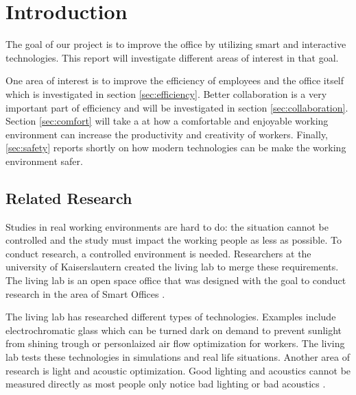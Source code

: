 \section{Introduction}
The goal of our project is to improve the office by utilizing smart and interactive technologies. This report will investigate different areas of interest in that goal. 


One area of interest is to improve the efficiency of employees and the office itself which is investigated in section \ref{sec:efficiency}. Better collaboration is a very important part of efficiency and will be investigated in section \ref{sec:collaboration}. Section \ref{sec:comfort} will take a at how a comfortable and enjoyable working environment can increase the productivity and creativity of workers. Finally, \ref{sec:safety} reports shortly on how modern technologies can be make the working environment safer.

\subsection{Related Research}
Studies in real working environments are hard to do: the situation cannot be controlled and the study must impact the working people as less as possible. To conduct research, a controlled environment is needed. Researchers at the university of Kaiserslautern created the living lab to merge these requirements. The living lab is an open space office that was designed with the goal to conduct research in the area of Smart Offices \cite{living-lab}.


The living lab has researched different types of technologies. Examples include electrochromatic glass which can be turned dark on demand to prevent sunlight from shining trough or personlaized air flow optimization for workers. The living lab tests these technologies in simulations and real life situations. Another area of research is light and acoustic optimization. Good lighting and acoustics cannot be measured directly as most people only notice bad lighting or bad acoustics \cite{living-lab}.


